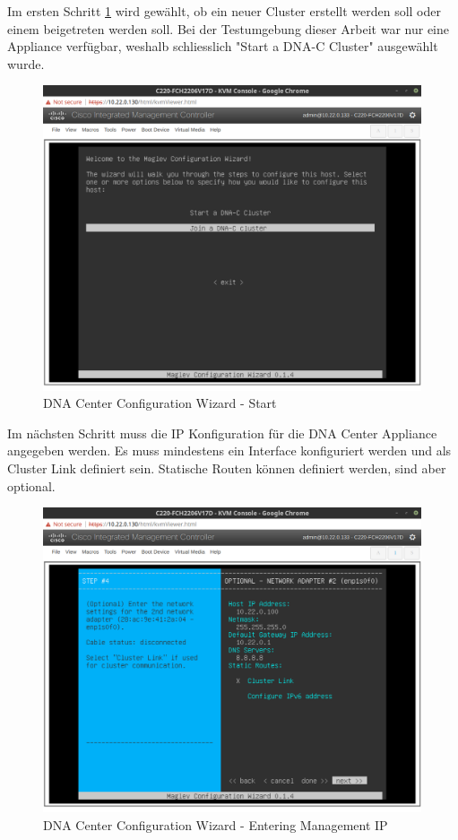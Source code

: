 Im ersten Schritt \ref{fig:dna-center-install-step-1} wird gewählt, ob ein neuer Cluster erstellt werden soll oder einem beigetreten werden soll. Bei der Testumgebung dieser Arbeit war nur eine Appliance verfügbar, weshalb schliesslich "Start a DNA-C Cluster" ausgewählt wurde. 

\begin{figure}[H]
	\centering
	\includegraphics[height=9cm]{img/sc_001.png}
	\caption{DNA Center Configuration Wizard - Start}
	\label{fig:dna-center-install-step-1}
\end{figure} 

Im nächsten Schritt muss die IP Konfiguration für die DNA Center Appliance angegeben werden. Es muss mindestens ein Interface konfiguriert werden und als Cluster Link definiert sein. Statische Routen können definiert werden, sind aber optional.

\begin{figure}[H]
	\centering
	\includegraphics[height=9cm]{img/sc_002.png}
	\caption{DNA Center Configuration Wizard - Entering Management IP}
	\label{fig:dna-center-install-step-4}
\end{figure} 

